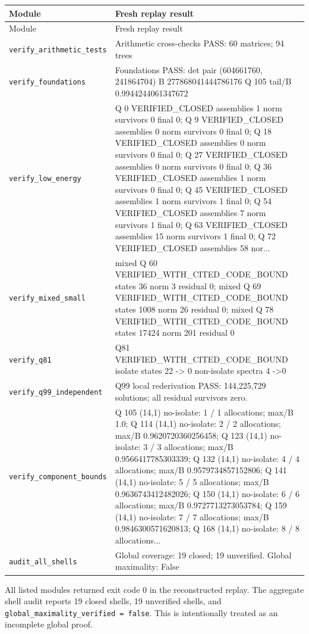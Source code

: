\small
\begin{longtable}{@{}p{48mm}p{93mm}@{}}
\toprule
Module & Fresh replay result \\
\midrule
\endfirsthead
\toprule
Module & Fresh replay result \\
\midrule
\endhead
\bottomrule
\endfoot
\texttt{verify\_arithmetic\_tests} & Arithmetic cross-checks PASS: 60 matrices; 94 trees \\
\texttt{verify\_foundations} & Foundations PASS: det pair (604661760, 241864704) B 277868041444786176 Q 105 tail/B 0.9944244061347672 \\
\texttt{verify\_low\_energy} & Q 0 VERIFIED\_CLOSED assemblies 1 norm survivors 0 final 0; Q 9 VERIFIED\_CLOSED assemblies 0 norm survivors 0 final 0; Q 18 VERIFIED\_CLOSED assemblies 0 norm survivors 0 final 0; Q 27 VERIFIED\_CLOSED assemblies 0 norm survivors 0 final 0; Q 36 VERIFIED\_CLOSED assemblies 1 norm survivors 0 final 0; Q 45 VERIFIED\_CLOSED assemblies 1 norm survivors 1 final 0; Q 54 VERIFIED\_CLOSED assemblies 7 norm survivors 1 final 0; Q 63 VERIFIED\_CLOSED assemblies 15 norm survivors 1 final 0; Q 72 VERIFIED\_CLOSED assemblies 58 nor... \\
\texttt{verify\_mixed\_small} & mixed Q 60 VERIFIED\_WITH\_CITED\_CODE\_BOUND states 36 norm 3 residual 0; mixed Q 69 VERIFIED\_WITH\_CITED\_CODE\_BOUND states 1008 norm 26 residual 0; mixed Q 78 VERIFIED\_WITH\_CITED\_CODE\_BOUND states 17424 norm 201 residual 0 \\
\texttt{verify\_q81} & Q81 VERIFIED\_WITH\_CITED\_CODE\_BOUND isolate states 22 -> 0 non-isolate spectra 4 ->0 \\
\texttt{verify\_q99\_independent} & Q99 local rederivation PASS: 144,225,729 solutions; all residual survivors zero. \\
\texttt{verify\_component\_bounds} & Q 105 (14,1) no-isolate: 1 / 1 allocations; max/B 1.0; Q 114 (14,1) no-isolate: 2 / 2 allocations; max/B 0.9620720360256458; Q 123 (14,1) no-isolate: 3 / 3 allocations; max/B 0.9566417785303339; Q 132 (14,1) no-isolate: 4 / 4 allocations; max/B 0.9579734857152806; Q 141 (14,1) no-isolate: 5 / 5 allocations; max/B 0.9636743412482026; Q 150 (14,1) no-isolate: 6 / 6 allocations; max/B 0.9727713273053784; Q 159 (14,1) no-isolate: 7 / 7 allocations; max/B 0.9846300571620813; Q 168 (14,1) no-isolate: 8 / 8 allocations... \\
\texttt{audit\_all\_shells} & Global coverage: 19 closed; 19 unverified. Global maximality: False \\
\end{longtable}
\normalsize
All listed modules returned exit code 0 in the reconstructed replay. The aggregate shell audit reports 19 closed shells, 19 unverified shells, and \texttt{global\_maximality\_verified = false}. This is intentionally treated as an incomplete global proof.
